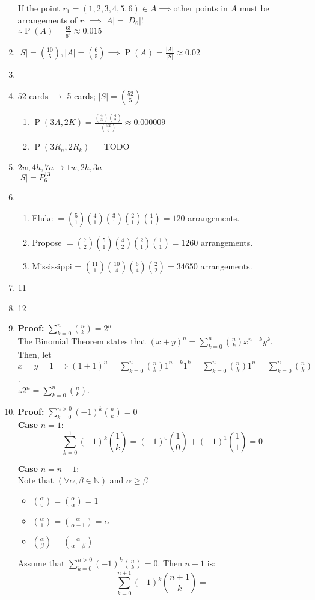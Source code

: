 \documentclass{article}
\newcommand{\proof}[1]{\textbf{Proof: #1}}
\newcommand{\ns}[1]{\mathbb{#1}}
\newcommand{\pr}[1]{\operatorname{P}(#1)}
\begin{document}
\begin{enumerate}
  If the point $r_1 = (1,2,3,4,5,6) \in A \implies$other points in $A$ must be arrangements of $r_1 \implies |A| = |D_6|!$\\
  $\therefore \pr{A} = \frac{6!}{6^6} \approx 0.015$
  \item $|S| = \binom{10}{5}, |A| = \binom{6}{5} \implies \pr{A} = \frac{|A|}{|S|} \approx 0.02$
  \item 
  \item $52$ cards $\to$ 5 cards; $|S| = \binom{52}{5}$ \begin{enumerate}
    \item $\pr{3A, 2K} = \frac{\binom{4}{3}\binom{4}{2}}{\binom{52}{5}} \approx 0.000009$
    \item $\pr{3R_n, 2R_k} = $ TODO
  \end{enumerate}
  \item $2w, 4h, 7a \to 1w, 2h, 3a$\\
  $|S| = P^{13}_6$
  \item \begin{enumerate}
    \item Fluke $=\binom{5}{1}\binom{4}{1}\binom{3}{1}\binom{2}{1}\binom{1}{1} = 120$ arrangements.
    \item Propose $= \binom{7}{2}\binom{5}{1}\binom{4}{2}\binom{2}{1}\binom{1}{1} = 1260$ arrangements.
    \item Mississippi = $\binom{11}{1}\binom{10}{4}\binom{6}{4}\binom{2}{2} = 34650$ arrangements.
  \end{enumerate}
  \item 11
  \item 12
  
  \newpage
  \item \proof{}$\sum_{k=0}^{n}\binom{n}{k} = 2^n$\\
  The Binomial Theorem states that $(x+y)^n = \sum_{k=0}^{n}\binom{n}{k}x^{n-k}y^k$.\\
  Then, let $x=y=1 \implies (1+1)^n = \sum_{k=0}^{n}\binom{n}{k}1^{n-k}1^k = \sum_{k=0}^{n}\binom{n}{k}1^n = \sum_{k=0}^{n}\binom{n}{k}$.\\
  $\therefore 2^n = \sum_{k=0}^{n}\binom{n}{k}$.
  
  \item \proof{} $\sum_{k=0}^{n>0}(-1)^k\binom{n}{k} = 0$\\
  \textbf{Case} $n=1$:\\
  \[\sum_{k=0}^{1}(-1)^k\binom{1}{k} = (-1)^0\binom{1}{0} + (-1)^1\binom{1}{1} = 0\]
  
  \textbf{Case} $n = n + 1$:\\
  Note that $(\forall \alpha, \beta \in\ns{N})$ and $\alpha \geq \beta$
  \begin{itemize}
    \item $\binom{\alpha}{0} = \binom{\alpha}{\alpha} = 1$
    \item $\binom{\alpha}{1} = \binom{\alpha}{\alpha - 1} = \alpha$
    \item $\binom{\alpha}{\beta} = \binom{\alpha}{\alpha - \beta}$
  \end{itemize}
  Assume that $\sum_{k=0}^{n>0}(-1)^k\binom{n}{k} = 0$. Then $n+1$ is:
  \[\sum_{k=0}^{n+1}(-1)^k\binom{n+1}{k} =\]


\end{enumerate}
\end{document}
